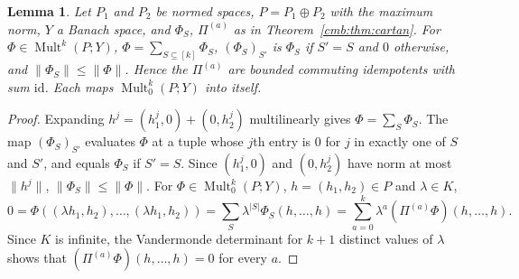 \documentclass[11pt]{amsart}
\newtheorem{lemma}[theorem]{Lemma}
\theoremstyle{definition}
\theoremstyle{remark}
\numberwithin{equation}{section}
\newcommand{\Mult}{\operatorname{Mult}}
\newcommand{\id}{\mathrm{id}}
\newcommand{\abs}[1]{\lvert #1\rvert}
\newcommand{\norm}[1]{\lVert #1\rVert}
\theoremstyle{plain}
\theoremstyle{definition}
\theoremstyle{plain}
\begin{document}
\begin{lemma}\label{ocl:lem:idempotents}
Let $P_1$ and $P_2$ be normed spaces, $P=P_1\oplus P_2$ with the maximum norm, $Y$ a Banach space, and $\Phi_S$,
$\Pi^{(a)}$ as in Theorem~\ref{cmb:thm:cartan}. For $\Phi\in\Mult^k(P;Y)$, $\Phi=\sum_{S\subseteq[k]}\Phi_S$,
$(\Phi_S)_{S'}$ is $\Phi_S$ if $S'=S$ and $0$ otherwise, and $\norm{\Phi_S}\le\norm\Phi$. Hence the $\Pi^{(a)}$ are
bounded commuting idempotents with sum $\id$. Each maps $\Mult^k_0(P;Y)$ into itself.
\end{lemma}

\begin{proof}
Expanding $h^j=(h^j_1,0)+(0,h^j_2)$ multilinearly gives $\Phi=\sum_S\Phi_S$. The map $(\Phi_S)_{S'}$ evaluates $\Phi$ at
a tuple whose $j$th entry is $0$ for $j$ in exactly one of $S$ and $S'$, and equals $\Phi_S$ if $S'=S$. Since
$(h^j_1,0)$ and $(0,h^j_2)$ have norm at most $\norm{h^j}$, $\norm{\Phi_S}\le\norm\Phi$. For $\Phi\in\Mult^k_0(P;Y)$,
$h=(h_1,h_2)\in P$ and $\lambda\in K$,
\[
 0=\Phi((\lambda h_1,h_2),\dots,(\lambda h_1,h_2))=\sum_S\lambda^{\abs S}\Phi_S(h,\dots,h)
 =\sum_{a=0}^k\lambda^a(\Pi^{(a)}\Phi)(h,\dots,h).
\]
Since $K$ is infinite, the Vandermonde determinant for $k+1$ distinct values of $\lambda$ shows that
$(\Pi^{(a)}\Phi)(h,\dots,h)=0$ for every $a$.
\end{proof}
\end{document}
